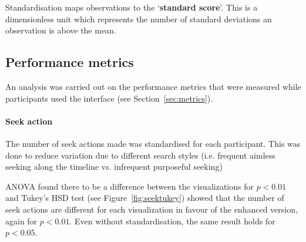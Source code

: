 Standardisation maps observations to the `\textbf{standard score}'. This is a
dimensionless unit which represents the number of standard deviations an
observation is above the mean.

\subsection{Performance metrics}\label{sec:studymetrics}
An analysis was carried out on the performance metrics that were measured while
participants used the interface (see Section~\ref{sec:metrics}).

\paragraph{Seek action}
The number of seek actions made was standardised for each participant. This was
done to reduce variation due to different search styles (i.e. frequent aimless
seeking along the timeline vs. infrequent purposeful seeking)

ANOVA found there to be a difference between the visualizations for $p < 0.01$
and Tukey's HSD test (see Figure~\ref{fig:seektukey}) showed that the number of
seek actions are different for each visualization in favour of the enhanced
version, again for $p < 0.01$. Even without standardisation, the same result
holds for $p < 0.05$.

